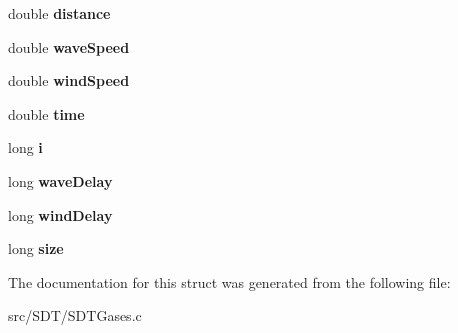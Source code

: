 \begin{DoxyCompactItemize}
\item 
\hypertarget{struct_s_d_t_explosion_a79b8e036dca6911e3295a47d99f21f43}{}double {\bfseries distance}\label{struct_s_d_t_explosion_a79b8e036dca6911e3295a47d99f21f43}

\item 
\hypertarget{struct_s_d_t_explosion_abb184b6a40b7cda371fae97a9ed873ca}{}double {\bfseries wave\+Speed}\label{struct_s_d_t_explosion_abb184b6a40b7cda371fae97a9ed873ca}

\item 
\hypertarget{struct_s_d_t_explosion_a1e61109612ce4b40408c03d7d23405c5}{}double {\bfseries wind\+Speed}\label{struct_s_d_t_explosion_a1e61109612ce4b40408c03d7d23405c5}

\item 
\hypertarget{struct_s_d_t_explosion_ab2d5aa7fce1a14d8bddfb2c333ea9679}{}double {\bfseries time}\label{struct_s_d_t_explosion_ab2d5aa7fce1a14d8bddfb2c333ea9679}

\item 
\hypertarget{struct_s_d_t_explosion_a139066bd9e344a8daae82c5ca919fffe}{}long {\bfseries i}\label{struct_s_d_t_explosion_a139066bd9e344a8daae82c5ca919fffe}

\item 
\hypertarget{struct_s_d_t_explosion_a0594bfa6822628c031e1d1f548dbdc16}{}long {\bfseries wave\+Delay}\label{struct_s_d_t_explosion_a0594bfa6822628c031e1d1f548dbdc16}

\item 
\hypertarget{struct_s_d_t_explosion_aa2a8eba12372ccd0e7bbf527d34e4b46}{}long {\bfseries wind\+Delay}\label{struct_s_d_t_explosion_aa2a8eba12372ccd0e7bbf527d34e4b46}

\item 
\hypertarget{struct_s_d_t_explosion_a37363161b41c4165b98cba7abc7a9d95}{}long {\bfseries size}\label{struct_s_d_t_explosion_a37363161b41c4165b98cba7abc7a9d95}

\end{DoxyCompactItemize}


The documentation for this struct was generated from the following file\+:\begin{DoxyCompactItemize}
\item 
src/\+S\+D\+T/S\+D\+T\+Gases.\+c\end{DoxyCompactItemize}
